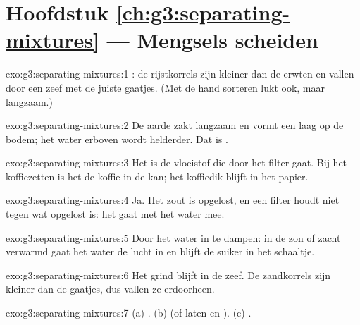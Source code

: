 \section*{Hoofdstuk \ref{ch:g3:separating-mixtures} --- Mengsels scheiden}

\begin{solution}{exo:g3:separating-mixtures:1}
: de rijstkorrels zijn kleiner dan de erwten en vallen door een zeef
met de juiste gaatjes. (Met de hand sorteren lukt ook, maar langzaam.)
\end{solution}

\begin{solution}{exo:g3:separating-mixtures:2}
De aarde zakt langzaam en vormt een laag op de bodem; het water erboven
wordt helderder. Dat is .
\end{solution}

\begin{solution}{exo:g3:separating-mixtures:3}
Het  is de vloeistof die door het filter gaat. Bij het
koffiezetten is het  de koffie in de kan; het koffiedik blijft in
het papier.
\end{solution}

\begin{solution}{exo:g3:separating-mixtures:4}
Ja. Het zout is opgelost, en een filter houdt niet tegen wat opgelost
is: het gaat met het water mee.
\end{solution}

\begin{solution}{exo:g3:separating-mixtures:5}
Door het water in te dampen: in de zon of zacht verwarmd gaat het water
de lucht in en blijft de suiker in het schaaltje.
\end{solution}

\begin{solution}{exo:g3:separating-mixtures:6}
Het grind blijft in de zeef. De zandkorrels zijn kleiner dan de gaatjes,
dus vallen ze erdoorheen.
\end{solution}

\begin{solution}{exo:g3:separating-mixtures:7}
(a) . (b)  (of laten  en ). (c) .
\end{solution}

